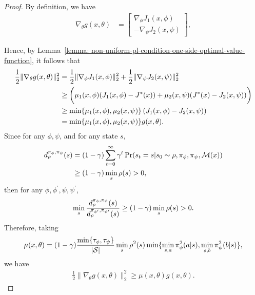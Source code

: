 \documentclass{article}
\theoremstyle{plain}
\theoremstyle{definition}
\theoremstyle{remark}
\def\cM{\mathcal M}
\def\cS{\mathcal S}
\begin{document}
\begin{proof}
    By definition, we have
    \begin{align}
        \nabla_{\theta} g(x,\theta) & = 
        \begin{bmatrix}
            \nabla_{\phi} J_1(x,\phi) \\
            - \nabla_{\psi} J_2(x,\psi)
        \end{bmatrix},
    \end{align}

    Hence, by Lemma~\ref{lemma: non-uniform-pl-condition-one-side-optimal-value-function}, it follows that
    \begin{align}
        \frac{1}{2}\| \nabla_{\theta} g(x,\theta) \|_2^2 & =  \frac{1}{2}\| \nabla_{\phi} J_1(x,\phi) \|_2^2 + \frac{1}{2}\| \nabla_{\psi} J_2(x,\psi) \|_2^2 \notag \\
        & \geq  \bigg(
            \mu_1(x,\phi) (J_1(x,\phi) - J^*(x)) + \mu_2(x,\psi) (J^*(x) - J_2(x,\psi))
        \bigg) \notag \\
        & \geq \min\{\mu_1(x,\phi), \mu_2(x,\psi)\} \left(
            J_1(x,\phi) - J_2(x,\psi) \right)\notag  \\
        & = \min\{\mu_1(x,\phi), \mu_2(x,\psi)\} g(x,\theta).
    \end{align}
    Since for any $\phi,\psi$, and for any state $s$, 
    \begin{align}
        d^{\pi_\phi,\pi_\psi}_\rho (s) & = (1-\gamma) \sum_{t=0}^\infty \gamma^t \Pr(s_t = s | s_0 \sim \rho, \pi_\phi, \pi_\psi, \cM(x)) \notag \\
        & \geq (1-\gamma) \min_{s} \rho(s) > 0, \notag
    \end{align} 
    then for any $\phi,\phi^\prime,\psi,\psi^\prime$,
    \begin{align}
        \min_s \frac{d^{\pi_\phi,\pi_\psi}_\rho (s) }{d^{\pi_{\phi^\prime},\pi_{\psi^\prime}}_\rho(s)} \geq (1-\gamma) \min_{s} \rho(s) > 0 \notag.
    \end{align}
    Therefore, taking
    \begin{align}
        \mu(x,\theta) = (1-\gamma)\frac{\min \{\tau_\phi,\tau_\psi\}}{|\cS|} \min_s \rho^2(s) \min\{ \min_{s,a}\pi^2_\phi(a|s), \min_{s,b} \pi^2_\psi(b|s) \}, \notag 
    \end{align}
    we have
    \begin{align}
        \frac{1}{2}\| \nabla_{\theta} g(x,\theta) \|_2^2 \geq \mu(x,\theta) g(x,\theta).
    \end{align}
\end{proof}
\end{document}

